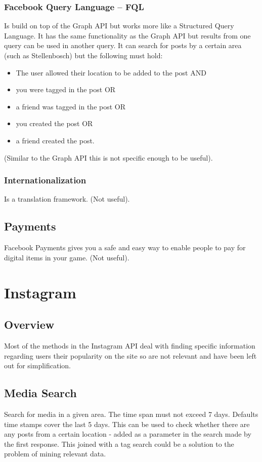 \documentclass{article}
\begin{document}
\subsubsection{Facebook Query Language -- FQL}
Is build on top of the Graph API but works more like a Structured Query Language.
It has the same functionality as the Graph API but results from one query can be used in another query. 
It can search for posts by a certain area (such as Stellenbosch) but the following must hold:
\begin{itemize}
\item The user allowed their location to be added to the post AND
\item you were tagged in the post OR
\item a friend was tagged in the post OR
\item you created the post OR
\item a friend created the post.
\end{itemize}
(Similar to the Graph API this is not specific enough to be useful).
\subsubsection{Internationalization}
Is a translation framework. (Not useful).
\subsection{Payments}
Facebook Payments gives you a safe and easy way to enable people to pay for digital items in your game. (Not useful).

\section{Instagram}
\subsection{Overview} 
Most of the methods in the Instagram API deal with finding specific information regarding users their popularity on the site so are not relevant and have been left out for simplification.
\subsection{Media Search} Search for media in a given area. The time span must not exceed 7 days. Defaults time stamps cover the last 5 days. This can be used to check whether there are any posts from a certain location - added as a parameter in the search made by the first response. This joined with a tag search could be a solution to the problem of mining relevant data.
\end{document}
